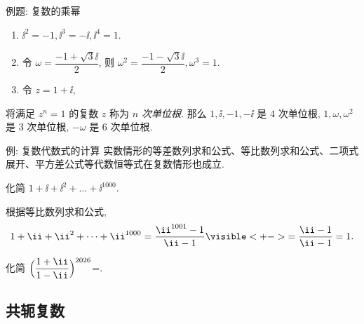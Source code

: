 \begin{frame}{例题: 复数的乘幂}
	\onslide<+->
	\begin{example}
		\begin{enumerate}
			\item $\ii^2=-1,\ii^3=-\ii ,\ii^4=1$.
			\onslide<+->{%
			一般地, 对于整数 $n$, 
			\[
				\ii^{4n}=1,\quad \ii^{4n+1}=i,\quad
				\ii^{4n+2}=-1,\quad \ii^{4n+3}=-\ii.
			\]
			}
			\vspace{-\baselineskip}
			\item 令 $\omega=\dfrac{-1+\sqrt 3\ii}2$, 则 $\omega^2=\dfrac{-1-\sqrt3\ii}2,\omega^3=1$.
			\item 令 $z=1+\ii$, \onslide<+->{则
			\[
				z^2=2\ii,\quad z^3=-2+2\ii,\quad z^4=-4,\quad z^8=16=2^4.
			\]}
		\end{enumerate}
		\bigdel\bigdel
	\end{example}
	\onslide<+->
	将满足 $z^n=1$ 的复数 $z$ 称为 \emph{$n$ 次单位根}.
	\onslide<+->
	那么 $1,\ii,-1,-\ii $ 是 $4$ 次单位根, $1,\omega,\omega^2$ 是 $3$ 次单位根, $-\omega$ 是 $6$ 次单位根.
\end{frame}


\begin{frame}{例: 复数代数式的计算}
	\onslide<+->
	实数情形的等差数列求和公式、等比数列求和公式、二项式展开、平方差公式等代数恒等式在复数情形也成立.
	\onslide<+->
	\begin{example}[nearnext]
		化简 $1+\ii+\ii^2+\dots+\ii^{1000}$.
	\end{example}
	\onslide<+->
	\begin{solution}[nearprev]
		根据等比数列求和公式,
		\[
			1+\ii+\ii^2+\dots+\ii^{1000}
			=\dfrac{\ii^{1001}-1}{\ii-1}
			\visible<+->{=\dfrac{\ii-1}{\ii-1}=1.}
		\]
	\end{solution}
	\onslide<+->
	\begin{exercise}
		化简 $\Bigl(\dfrac{1+\ii}{1-\ii}\Bigr)^{2026}$=.
	\end{exercise}
\end{frame}


\subsection{共轭复数}


